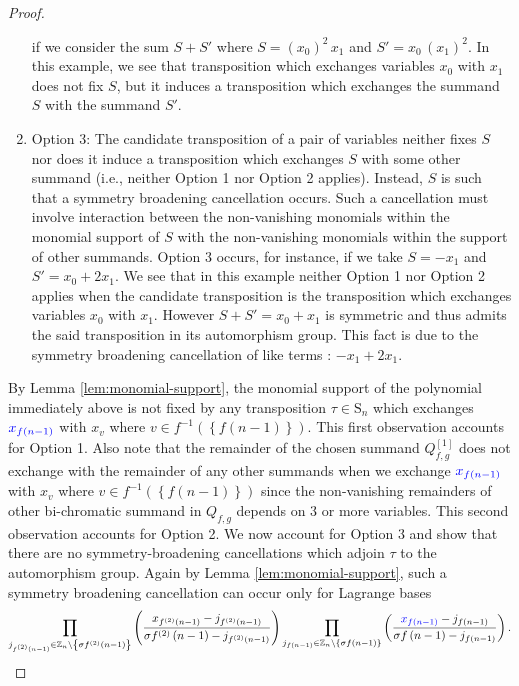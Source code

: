 \begin{proof}
\begin{enumerate}
if we consider the sum $S+S'$ where $S=(x_{0})^{2}\,x_{1}$ and $S'=x_{0}\,(x_{1})^{2}$.
In this example, we see that transposition which exchanges variables
$x_{0}$ with $x_{1}$ does not fix $S$, but it induces a transposition
which exchanges the summand $S$ with the summand $S'$.
\item Option 3: The candidate transposition of a pair of variables neither
fixes $S$ nor does it induce a transposition which exchanges $S$
with some other summand (i.e., neither Option 1 nor Option 2 applies).
Instead, $S$ is such that a symmetry broadening cancellation occurs.
Such a cancellation must involve interaction between the non-vanishing
monomials within the monomial support of $S$ with the non-vanishing monomials
within the support of other summands. Option 3 occurs, for instance,
if we take $S=-x_{1}$ and $S'=x_{0}+2x_{1}$. We see that in this
example neither Option 1 nor Option 2 applies when the candidate transposition
is the transposition which exchanges variables $x_{0}$ with $x_{1}$.
However $S+S'=x_{0}+x_{1}$ is symmetric and thus admits the said transposition
in its automorphism group. This fact is due to the symmetry broadening
cancellation of like terms : $-x_{1}+2x_{1}$.
\end{enumerate}
By Lemma \ref{lem:monomial-support}, the monomial support of the polynomial immediately above is not fixed by any
transposition $\tau\in\text{S}_{n}$ which exchanges ${\color{blue}x_{f\left(n-1\right)}}$
with $x_{v}$ where $v\in f^{-1}\left(\left\{ f\left(n-1\right)\right\} \right)$.
This first observation accounts for Option 1. Also note that the remainder
of the chosen summand $Q_{f,g}^{\left[1\right]}$ does not exchange with the remainder of any
other summands when we exchange ${\color{blue}x_{f\left(n-1\right)}}$
with $x_{v}$ where $v\in f^{-1}\left(\left\{ f\left(n-1\right)\right\} \right)$ since the non-vanishing remainders of other
bi-chromatic summand in $Q_{f,g}$ depends on $3$ or more variables.
This second observation accounts for Option 2. We now account for
Option 3 and show that there are no symmetry-broadening
cancellations which adjoin $\tau$ to the automorphism group. Again by Lemma \ref{lem:monomial-support}, such a symmetry broadening cancellation
can occur only for Lagrange bases
\[
\prod_{j_{f^{(2)}\left(n-1\right)}\in\mathbb{Z}_{n}\backslash\left\{ \sigma f^{(2)}\left(n-1\right)\right\} }\left(\frac{x_{f^{(2)}\left(n-1\right)}-j_{f^{(2)}\left(n-1\right)}}{\sigma f^{(2)}\left(n-1\right)-j_{f^{(2)}\left(n-1\right)}}\right)\prod_{j_{f\left(n-1\right)}\in\mathbb{Z}_{n}\backslash\left\{ \sigma f\left(n-1\right)\right\} }\left(\frac{{\color{blue}x_{f\left(n-1\right)}}-j_{f\left(n-1\right)}}{\sigma f\left(n-1\right)-j_{f\left(n-1\right)}}\right).
\]
\end{proof}
